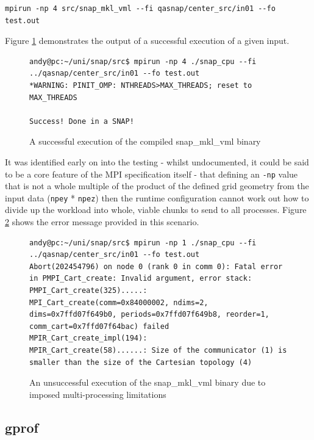 \documentclass[conference]{IEEEtran}
\begin{document}
\begin{lstlisting}[breaklines]
mpirun -np 4 src/snap_mkl_vml --fi qasnap/center_src/in01 --fo test.out
\end{lstlisting}

Figure \ref{fig:snap-successful-run} demonstrates the output of a successful execution of a given input.

\begin{figure}
    \centering
    \begin{lstlisting}[breaklines]
andy@pc:~/uni/snap/src$ mpirun -np 4 ./snap_cpu --fi ../qasnap/center_src/in01 --fo test.out
*WARNING: PINIT_OMP: NTHREADS>MAX_THREADS; reset to MAX_THREADS

Success! Done in a SNAP!
    \end{lstlisting}
    \caption{A successful execution of the compiled snap\_mkl\_vml binary}
    \label{fig:snap-successful-run}
\end{figure}

It was identified early on into the testing - whilst undocumented, it could be said to be a core feature of the MPI specification itself - that defining an \texttt{-np} value that is not a whole multiple of the product of the defined grid geometry from the input data (\texttt{npey} * \texttt{npez}) then the runtime configuration cannot work out how to divide up the workload into whole, viable chunks to send to all processes. Figure \ref{fig:snap-unsuccessful-run} shows the error message provided in this scenario.

\begin{figure}
    \centering
    \begin{lstlisting}[breaklines]
andy@pc:~/uni/snap/src$ mpirun -np 1 ./snap_cpu --fi ../qasnap/center_src/in01 --fo test.out
Abort(202454796) on node 0 (rank 0 in comm 0): Fatal error in PMPI_Cart_create: Invalid argument, error stack:
PMPI_Cart_create(325).....: MPI_Cart_create(comm=0x84000002, ndims=2, dims=0x7ffd07f649b0, periods=0x7ffd07f649b8, reorder=1, comm_cart=0x7ffd07f64bac) failed
MPIR_Cart_create_impl(194): 
MPIR_Cart_create(58)......: Size of the communicator (1) is smaller than the size of the Cartesian topology (4)
    \end{lstlisting}
    \caption{An unsuccessful execution of the snap\_mkl\_vml binary due to imposed multi-processing limitations}
    \label{fig:snap-unsuccessful-run}
\end{figure}


\subsection{gprof}
\end{document}
